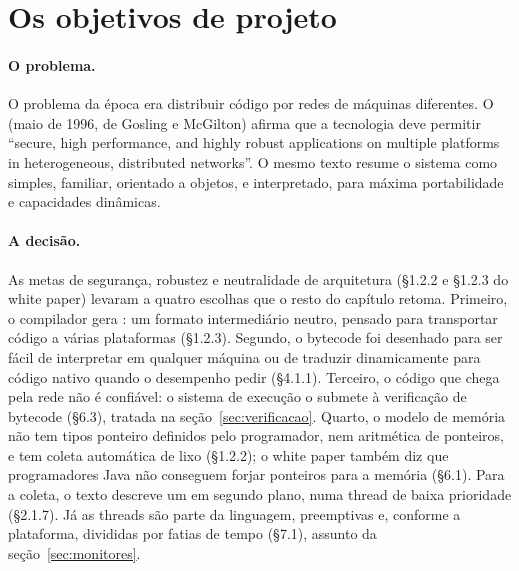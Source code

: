 \section{Os objetivos de projeto}
\label{sec:objetivos-1995}

\paragraph{O problema.}
O problema da época era distribuir código por redes de máquinas
diferentes. O  
(maio de 1996, de Gosling e McGilton) afirma que a
tecnologia deve permitir \enquote{secure, high performance, and highly
robust applications on multiple platforms in heterogeneous, distributed
networks}. O mesmo texto resume o sistema como simples, familiar,
orientado a objetos,  e interpretado, para máxima
portabilidade e capacidades dinâmicas.

\paragraph{A decisão.}
As metas de segurança, robustez e neutralidade de arquitetura (§1.2.2 e
§1.2.3 do white paper) levaram a quatro escolhas que o resto do capítulo
retoma. Primeiro, o compilador gera : um formato intermediário neutro,
pensado para transportar código a várias plataformas (§1.2.3). Segundo,
o bytecode foi desenhado para ser fácil de interpretar em qualquer
máquina ou de traduzir dinamicamente para código nativo quando o
desempenho pedir (§4.1.1). Terceiro, o código que chega pela rede não é
confiável: o sistema de execução o submete à verificação de bytecode
(§6.3), tratada na seção~\ref{sec:verificacao}. Quarto, o modelo de
memória não tem tipos ponteiro definidos pelo programador, nem aritmética
de ponteiros, e tem coleta automática de lixo (§1.2.2); o white paper
também diz que programadores Java não conseguem forjar ponteiros para a
memória (§6.1). Para a coleta, o texto descreve um  em segundo plano, numa thread de baixa
prioridade (§2.1.7). Já as threads são parte da linguagem, preemptivas e,
conforme a plataforma, divididas por fatias de tempo (§7.1), assunto da
seção~\ref{sec:monitores}.

